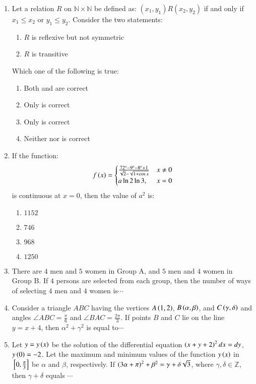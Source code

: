 \documentclass[journal,12pt,twocolumn]{IEEEtran}
\theoremstyle{remark}
\begin{document}
\begin{enumerate}[start=16]
    \item Let a relation $R$ on $\mathbb{N} \times \mathbb{N}$ be defined as: $(x_1, y_1) R (x_2, y_2)$ if and only if $x_1 \leq x_2$ or $y_1 \leq y_2$. Consider the two statements:
    \begin{enumerate}
        \item $R$ is reflexive but not symmetric
        \item $R$ is transitive
    \end{enumerate}
    Which one of the following is true:
    \begin{enumerate}
        \item Both  and  are correct
        \item Only  is correct
        \item Only  is correct
        \item Neither  nor  is correct
    \end{enumerate}

    \item If the function:
    $$
		f\left(x\right) = 
    \begin{cases}
    \frac{72^a-9^a-8^a+1}{\sqrt{2}-\sqrt{1+\cos x}} &  x \neq 0 \\
    a\ln{2}\ln{3}, &  x = 0
    \end{cases}
    $$
    is continuous at $x = 0$, then the value of $a^2$ is:
    \begin{enumerate}
        \item $1152$
        \item $746$
        \item $968$
        \item $1250$
    \end{enumerate}

    \item There are $4$ men and $5$ women in Group A, and $5$ men and $4$ women in Group B. If $4$ persons are selected from each group, then the number of ways of selecting $4$ men and $4$ women is$\cdots$
    

    \item Consider a triangle $ABC$ having the vertices $A\left(1, 2\right)$, $B\left(\alpha, \beta\right)$, and $C\left(\gamma, \delta\right)$ and angles $\angle ABC = \frac{\pi}{6}$ and $\angle BAC = \frac{2\pi}{3}$. If points $B$ and $C$ lie on the line $y = x + 4$, then $\alpha^2 + \gamma^2$ is equal to$\cdots$
    

    \item Let $y = y\left(x\right)$ be the solution of the differential equation $\left(x + y + 2\right)^2  dx = dy$, $y\left(0\right) = -2$. Let the maximum and minimum values of the function $y\left(x\right)$ in ${}\left[0, \frac{\pi}{3}\right]$ be $\alpha$ and $\beta$, respectively. If $\left(3\alpha + \pi\right)^2 + \beta^2 = \gamma + \delta\sqrt{3}$, where $\gamma, \delta \in \mathbb{Z}$, then $\gamma + \delta$ equals $\cdots$
    

\end{enumerate}
\end{document}
